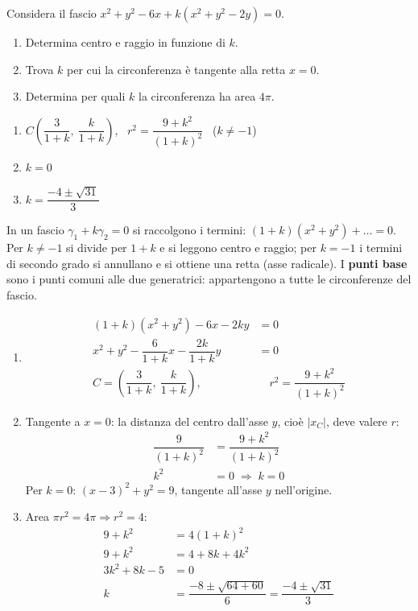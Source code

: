 
\begin{question}[ID=6.4, subtitle={Fascio $x^2+y^2-6x+k(x^2+y^2-2y)=0$: centro e tangenza}, difficulty=media, tags={fasci, circonferenze}]
Considera il fascio $x^2+y^2-6x+k(x^2+y^2-2y)=0$.
\begin{enumerate}
\item Determina centro e raggio in funzione di $k$.
\item Trova $k$ per cui la circonferenza è tangente alla retta $x=0$.
\item Determina per quali $k$ la circonferenza ha area $4\pi$.
\end{enumerate}
\begin{solution}
\begin{enumerate}
    \item $C\left(\dfrac{3}{1+k},\ \dfrac{k}{1+k}\right)$, \ $r^2=\dfrac{9+k^2}{(1+k)^2}$ \ ($k\neq-1$)
    \item $k=0$
    \item $k=\dfrac{-4\pm\sqrt{31}}{3}$
\end{enumerate}
\end{solution}
\begin{explanation}
In un fascio $\gamma_1+k\gamma_2=0$ si raccolgono i termini: $(1+k)(x^2+y^2)+\dots=0$. Per $k\neq-1$ si divide per $1+k$ e si leggono centro e raggio; per $k=-1$ i termini di secondo grado si annullano e si ottiene una retta (asse radicale). I \textbf{punti base} sono i punti comuni alle due generatrici: appartengono a tutte le circonferenze del fascio.
\begin{enumerate}
    \item \[\begin{aligned}
    (1+k)(x^2+y^2)-6x-2ky &= 0\\
    x^2+y^2-\dfrac{6}{1+k}x-\dfrac{2k}{1+k}y &= 0\\
    C=\left(\dfrac{3}{1+k},\ \dfrac{k}{1+k}\right), &\quad r^2=\dfrac{9+k^2}{(1+k)^2}
    \end{aligned}\]
    \item Tangente a $x=0$: la distanza del centro dall'asse $y$, cioè $|x_C|$, deve valere $r$:
    \[\begin{aligned}
    \dfrac{9}{(1+k)^2} &= \dfrac{9+k^2}{(1+k)^2}\\
    k^2 &= 0 \;\Rightarrow\; k=0
    \end{aligned}\]
    Per $k=0$: $(x-3)^2+y^2=9$, tangente all'asse $y$ nell'origine.
    \item Area $\pi r^2=4\pi \Rightarrow r^2=4$:
    \[\begin{aligned}
    9+k^2 &= 4(1+k)^2\\
    9+k^2 &= 4+8k+4k^2\\
    3k^2+8k-5 &= 0\\
    k &= \dfrac{-8\pm\sqrt{64+60}}{6}=\dfrac{-4\pm\sqrt{31}}{3}
    \end{aligned}\]
\end{enumerate}
\end{explanation}
\end{question}

